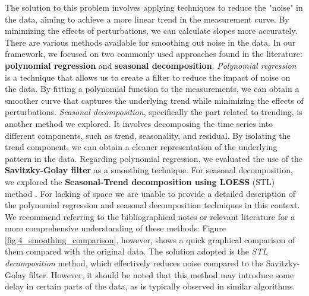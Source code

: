 The solution to this problem involves applying techniques to reduce the "noise" in the data, aiming to achieve a more linear trend in the measurement curve. By minimizing the effects of perturbations, we can calculate slopes more accurately.\newline
There are various methods available for smoothing out noise in the data. In our framework, we focused on two commonly used approaches found in the literature: \textbf{polynomial regression} and \textbf{seasonal decomposition}.\newline \newline
\textit{Polynomial regression} is a technique that allows us to create a filter to reduce the impact of noise on the data. By fitting a polynomial function to the measurements, we can obtain a smoother curve that captures the underlying trend while minimizing the effects of perturbations.\newline
\textit{Seasonal decomposition}, specifically the part related to trending, is another method we explored. It involves decomposing the time series into different components, such as trend, seasonality, and residual. By isolating the trend component, we can obtain a cleaner representation of the underlying pattern in the data.\newline
Regarding polynomial regression, we evaluated the use of the \textbf{Savitzky-Golay filter} \cite{savgol} as a smoothing technique. For seasonal decomposition, we explored the \textbf{Seasonal-Trend decomposition using LOESS} (STL) method \cite{stl_decomp}.\newline \newline
For lacking of space we are unable to provide a detailed description of the polynomial regression and seasonal decomposition techniques in this context. We recommend referring to the bibliographical notes or relevant literature for a more comprehensive understanding of these methods: Figure \ref{fig:4_smoothing_comparison}, however, shows a quick graphical comparison of them compared with the original data. The solution adopted is the \textit{STL decomposition} method, which effectively reduces noise compared to the Savitzky-Golay filter. However, it should be noted that this method may introduce some delay in certain parts of the data, as is typically observed in similar algorithms.

